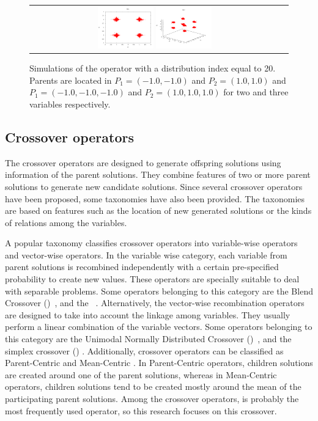 %
\begin{figure}[t]
\centering
\begin{tabular}{cc}
   \includegraphics[width=0.23\textwidth]{img/Operadores/SBX_eta_20_2D.png} 
   \includegraphics[width=0.23\textwidth]{img/Operadores/SBX_eta_20_3D.png} 
\end{tabular}
\caption{Simulations of the \SBX{} operator with a distribution index equal to 20. Parents are located in $P_1=(-1.0, -1.0)$ and $P_2=(1.0, 1.0)$ and $P_1=(-1.0, -1.0, -1.0)$ and $P_2=(1.0, 1.0, 1.0)$ for two and three variables respectively.}
\label{fig:Simulations_Index_20}
\end{figure}


\subsection{Crossover operators}

The crossover operators are designed to generate offspring solutions using information of the parent solutions.
%
They combine features of two or more parent solutions to generate new candidate solutions.
%
Since several crossover operators have been proposed, some taxonomies have also been provided.
%
The taxonomies are based on features such as the location of new generated solutions or the kinds of relations among the variables.

A popular taxonomy classifies crossover operators into variable-wise operators and vector-wise operators.
%
In the variable wise category, each variable from parent solutions is recombined independently with a certain pre-specified probability to create new values.
%
These operators are specially suitable to deal with separable problems.
%
Some operators belonging to this category are the Blend Crossover (\BLX{})~\cite{eshelman1993real}, and the \SBX{}~\cite{Joel:SBX1994}.
%
Alternatively, the vector-wise recombination operators are designed to take into account the linkage among variables.
%
They usually perform a linear combination of the variable vectors.
%
Some operators belonging to this category are the Unimodal Normally Distributed Crossover (\UNDX{})~\cite{Joel:UNDX}, and the simplex crossover (\SPX{}) \cite{Joel:DE_Storn_SPX}.
%
Additionally, crossover operators can be classified as Parent-Centric and Mean-Centric \cite{jain2011parent}.
%
In Parent-Centric operators, children solutions are created around one of the parent solutions, whereas in Mean-Centric operators, children solutions tend to be created mostly 
around the mean of the participating parent solutions.
%
Among the crossover operators, \SBX{} is probably the most frequently used operator, so this research focuses on this crossover.

